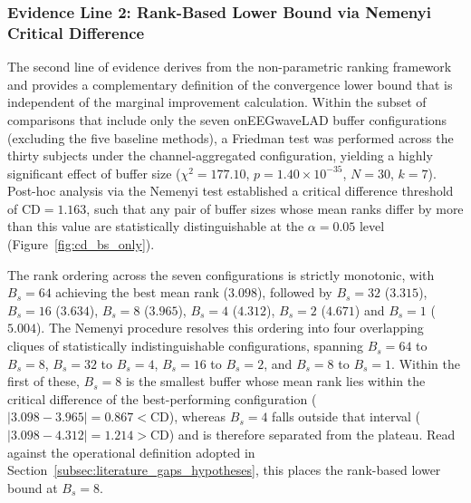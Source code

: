 \documentclass[MScCS,12pt,oneside,final]{uccthesis}
\begin{document}
\subsubsection*{Evidence Line 2: Rank-Based Lower Bound via Nemenyi Critical Difference}

The second line of evidence derives from the non-parametric ranking framework and provides a complementary definition of the convergence lower bound that is independent of the marginal improvement calculation. Within the subset of comparisons that include only the seven onEEGwaveLAD buffer configurations (excluding the five baseline methods), a Friedman test was performed across the thirty subjects under the channel-aggregated configuration, yielding a highly significant effect of buffer size ($\chi^2 = 177.10$, $p = 1.40 \times 10^{-35}$, $N = 30$, $k = 7$). Post-hoc analysis via the Nemenyi test established a critical difference threshold of $\mathrm{CD} = 1.163$, such that any pair of buffer sizes whose mean ranks differ by more than this value are statistically distinguishable at the $\alpha = 0.05$ level (Figure~\ref{fig:cd_bs_only}).

The rank ordering across the seven configurations is strictly monotonic, with $B_s = 64$ achieving the best mean rank ($3.098$), followed by $B_s = 32$ ($3.315$), $B_s = 16$ ($3.634$), $B_s = 8$ ($3.965$), $B_s = 4$ ($4.312$), $B_s = 2$ ($4.671$) and $B_s = 1$ ($5.004$). The Nemenyi procedure resolves this ordering into four overlapping cliques of statistically indistinguishable configurations, spanning $B_s = 64$ to $B_s = 8$, $B_s = 32$ to $B_s = 4$, $B_s = 16$ to $B_s = 2$, and $B_s = 8$ to $B_s = 1$. Within the first of these, $B_s = 8$ is the smallest buffer whose mean rank lies within the critical difference of the best-performing configuration ($|3.098 - 3.965| = 0.867 < \mathrm{CD}$), whereas $B_s = 4$ falls outside that interval ($|3.098 - 4.312| = 1.214 > \mathrm{CD}$) and is therefore separated from the plateau. Read against the operational definition adopted in Section~\ref{subsec:literature_gaps_hypotheses}, this places the rank-based lower bound at $B_s = 8$.
\end{document}
